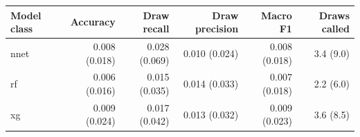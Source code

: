 
\begin{tabular}{lrrrrr}
\toprule
Model class & Accuracy & Draw recall & Draw precision & Macro F1 & Draws called\\
\midrule
nnet & 0.008 (0.018) & 0.028 (0.069) & 0.010 (0.024) & 0.008 (0.018) & 3.4 (9.0)\\
rf & 0.006 (0.016) & 0.015 (0.035) & 0.014 (0.033) & 0.007 (0.018) & 2.2 (6.0)\\
xg & 0.009 (0.024) & 0.017 (0.042) & 0.013 (0.032) & 0.009 (0.023) & 3.6 (8.5)\\
\bottomrule
\end{tabular}

